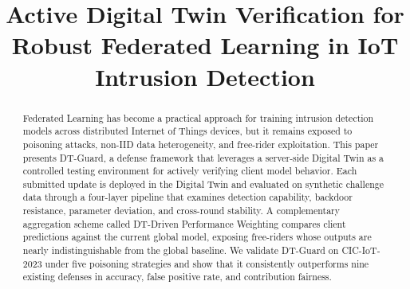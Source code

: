 \documentclass[conference]{IEEEtran}
\begin{document}
    
    \title{Active Digital Twin Verification for Robust Federated Learning in IoT Intrusion Detection}
    
    \author{
    \and
    \and
    }
    
    \maketitle
    
    \begin{abstract}
    Federated Learning has become a practical approach for training intrusion detection models across distributed Internet of Things devices, but it remains exposed to poisoning attacks, non-IID data heterogeneity, and free-rider exploitation. This paper presents DT-Guard, a defense framework that leverages a server-side Digital Twin as a controlled testing environment for actively verifying client model behavior. Each submitted update is deployed in the Digital Twin and evaluated on synthetic challenge data through a four-layer pipeline that examines detection capability, backdoor resistance, parameter deviation, and cross-round stability. A complementary aggregation scheme called DT-Driven Performance Weighting compares client predictions against the current global model, exposing free-riders whose outputs are nearly indistinguishable from the global baseline. We validate DT-Guard on CIC-IoT-2023 under five poisoning strategies and show that it consistently outperforms nine existing defenses in accuracy, false positive rate, and contribution fairness.
    \end{abstract}
    
\end{document}
